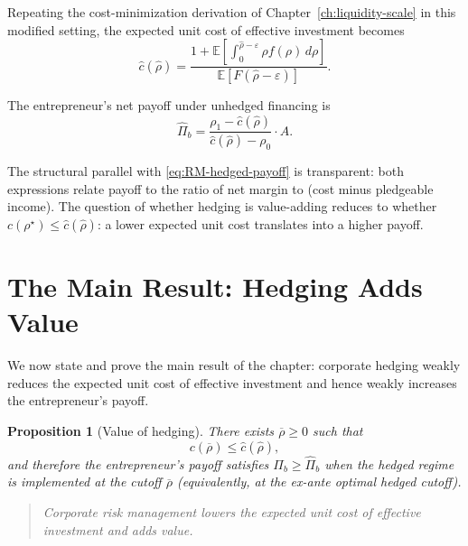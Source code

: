 \documentclass[11pt,a4paper,oneside]{book}
\def\E{\mathbb{E}}
\def\leq{\leqslant}
\def\geq{\geqslant}
\theoremstyle{plain}
\newtheorem{proposition}[theorem]{Proposition}
\theoremstyle{definition}
\theoremstyle{remark}
\numberwithin{equation}{chapter}
\begin{document}
Repeating the cost-minimization derivation of Chapter~\ref{ch:liquidity-scale} in this modified setting, the expected unit cost of effective investment becomes
\begin{equation}\label{eq:RM-c-hat}
  \widehat{c}(\widehat{\rho}) = \frac{1 + \E\left[\int_0^{\widehat{\rho} - \varepsilon} \rho f(\rho) \, d\rho\right]}{\E[F(\widehat{\rho} - \varepsilon)]}.
\end{equation}

The entrepreneur's net payoff under unhedged financing is
\begin{equation}\label{eq:RM-hat-payoff}
  \widehat{\Pi}_b = \frac{\rho_1 - \widehat{c}(\widehat{\rho})}{\widehat{c}(\widehat{\rho}) - \rho_0} \cdot A.
\end{equation}

The structural parallel with \eqref{eq:RM-hedged-payoff} is transparent: both expressions relate payoff to the ratio of net margin to (cost minus pledgeable income).
The question of whether hedging is value-adding reduces to whether $c(\rho^\star) \leq \widehat{c}(\widehat{\rho})$: a lower expected unit cost translates into a higher payoff.

\section{The Main Result: Hedging Adds Value}
\label{sec:RM-main}

We now state and prove the main result of the chapter: corporate hedging weakly reduces the expected unit cost of effective investment and hence weakly increases the entrepreneur's payoff.

\begin{proposition}[Value of hedging]\label{prop:RM-main}
There exists $\overline{\rho} \geq 0$ such that
\begin{equation}\label{eq:RM-main}
  c(\overline{\rho}) \leq \widehat{c}(\widehat{\rho}),
\end{equation}
and therefore the entrepreneur's payoff satisfies $\Pi_b \geq \widehat{\Pi}_b$ when the hedged regime is implemented at the cutoff $\overline{\rho}$ (equivalently, at the ex-ante optimal hedged cutoff).
\end{proposition}

\begin{quote}
\emph{Corporate risk management lowers the expected unit cost of effective investment and adds value.}
\end{quote}
\end{document}
